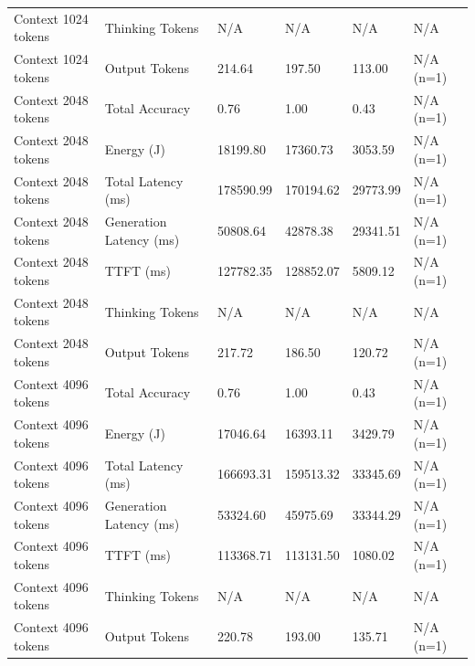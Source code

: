 \begin{table}
\begin{tabular}{llllll}
Context 1024 tokens & Thinking Tokens & N/A & N/A & N/A & N/A \\
Context 1024 tokens & Output Tokens & 214.64 & 197.50 & 113.00 & N/A (n=1) \\
Context 2048 tokens & Total Accuracy & 0.76 & 1.00 & 0.43 & N/A (n=1) \\
Context 2048 tokens & Energy (J) & 18199.80 & 17360.73 & 3053.59 & N/A (n=1) \\
Context 2048 tokens & Total Latency (ms) & 178590.99 & 170194.62 & 29773.99 & N/A (n=1) \\
Context 2048 tokens & Generation Latency (ms) & 50808.64 & 42878.38 & 29341.51 & N/A (n=1) \\
Context 2048 tokens & TTFT (ms) & 127782.35 & 128852.07 & 5809.12 & N/A (n=1) \\
Context 2048 tokens & Thinking Tokens & N/A & N/A & N/A & N/A \\
Context 2048 tokens & Output Tokens & 217.72 & 186.50 & 120.72 & N/A (n=1) \\
Context 4096 tokens & Total Accuracy & 0.76 & 1.00 & 0.43 & N/A (n=1) \\
Context 4096 tokens & Energy (J) & 17046.64 & 16393.11 & 3429.79 & N/A (n=1) \\
Context 4096 tokens & Total Latency (ms) & 166693.31 & 159513.32 & 33345.69 & N/A (n=1) \\
Context 4096 tokens & Generation Latency (ms) & 53324.60 & 45975.69 & 33344.29 & N/A (n=1) \\
Context 4096 tokens & TTFT (ms) & 113368.71 & 113131.50 & 1080.02 & N/A (n=1) \\
Context 4096 tokens & Thinking Tokens & N/A & N/A & N/A & N/A \\
Context 4096 tokens & Output Tokens & 220.78 & 193.00 & 135.71 & N/A (n=1) \\
\bottomrule
\end{tabular}
\end{table}
